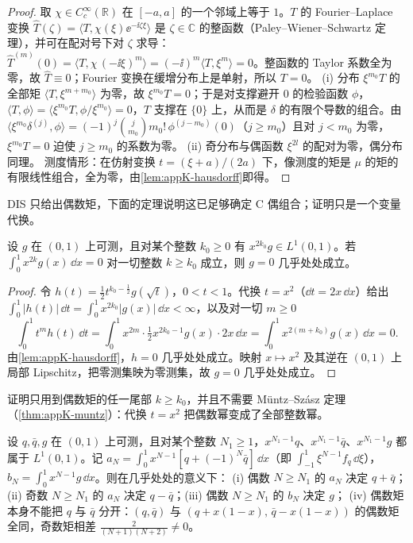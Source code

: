 \begin{proof}
取 $\chi\in C_c^\infty(\mathbb R)$ 在 $[-a,a]$ 的一个邻域上等于 $1$。$T$ 的 Fourier--Laplace 变换 $\hat T(\zeta)=\langle T,\chi(\xi)\ee^{-\ii\zeta\xi}\rangle$ 是 $\zeta\in\mathbb C$ 的整函数（Paley--Wiener--Schwartz 定理\cite[定理~7.3.1]{Hormander2003}），并可在配对号下对 $\zeta$ 求导：
$\hat T^{(m)}(0)=\langle T,\chi\,(-\ii\xi)^m\rangle=(-\ii)^m\langle T,\xi^m\rangle=0$。整函数的 Taylor 系数全为零，故 $\hat T\equiv0$；Fourier 变换在缓增分布上是单射\cite[第~7.1~节]{Hormander2003}，所以 $T=0$。
(i) 分布 $\xi^{m_0}T$ 的全部矩 $\langle T,\xi^{m+m_0}\rangle$ 为零，故 $\xi^{m_0}T=0$；于是对支撑避开 $0$ 的检验函数 $\phi$，$\langle T,\phi\rangle=\langle\xi^{m_0}T,\phi/\xi^{m_0}\rangle=0$，$T$ 支撑在 $\{0\}$ 上，从而是 $\delta$ 的有限个导数的组合\cite[定理~2.3.4]{Hormander2003}。由 $\langle\xi^{m_0}\delta^{(j)},\phi\rangle=(-1)^j\binom{j}{m_0}m_0!\,\phi^{(j-m_0)}(0)$（$j\ge m_0$）且对 $j<m_0$ 为零，$\xi^{m_0}T=0$ 迫使 $j\ge m_0$ 的系数为零。
(ii) 奇分布与偶函数 $\xi^{2l}$ 的配对为零，偶分布同理。
测度情形：在仿射变换 $t=(\xi+a)/(2a)$ 下，像测度的矩是 $\mu$ 的矩的有限线性组合，全为零，由\cref{lem:appK-hausdorff}即得。
\end{proof}

DIS 只给出偶数矩，下面的定理说明这已足够确定 C 偶组合；证明只是一个变量代换。

\begin{theorem}[偶数矩决定函数]\label{thm:appK-even-moments}
设 $g$ 在 $(0,1)$ 上可测，且对某个整数 $k_0\ge0$ 有 $x^{2k_0}g\in L^1(0,1)$。若 $\int_0^1x^{2k}g(x)\,\dd x=0$ 对一切整数 $k\ge k_0$ 成立，则 $g=0$ 几乎处处成立。
\end{theorem}

\begin{proof}
令 $h(t)=\frac12t^{k_0-\frac12}g(\sqrt t)$，$0<t<1$。代换 $t=x^2$（$\dd t=2x\,\dd x$）给出 $\int_0^1|h(t)|\,\dd t=\int_0^1x^{2k_0}|g(x)|\,\dd x<\infty$，以及对一切 $m\ge0$
\[
\int_0^1t^mh(t)\,\dd t=\int_0^1x^{2m}\cdot\tfrac12x^{2k_0-1}g(x)\cdot2x\,\dd x=\int_0^1x^{2(m+k_0)}g(x)\,\dd x=0 .
\]
由\cref{lem:appK-hausdorff}，$h=0$ 几乎处处成立。映射 $x\mapsto x^2$ 及其逆在 $(0,1)$ 上局部 Lipschitz，把零测集映为零测集，故 $g=0$ 几乎处处成立。
\end{proof}

证明只用到偶数矩的任一尾部 $k\ge k_0$，并且不需要 Müntz--Szász 定理（\cref{thm:appK-muntz}）：代换 $t=x^2$ 把偶数幂变成了全部整数幂。

\begin{corollary}\label{cor:appK-pdf}
设 $q,\bar q,g$ 在 $(0,1)$ 上可测，且对某个整数 $N_1\ge1$，$x^{N_1-1}q$、$x^{N_1-1}\bar q$、$x^{N_1-1}g$ 都属于 $L^1(0,1)$。记 $a_N=\int_0^1x^{N-1}[q+(-1)^N\bar q]\,\dd x$（即 $\int_{-1}^1\xi^{N-1}f_q\,\dd\xi$），$b_N=\int_0^1x^{N-1}g\,\dd x$。则在几乎处处的意义下：
(i) 偶数 $N\ge N_1$ 的 $a_N$ 决定 $q+\bar q$；(ii) 奇数 $N\ge N_1$ 的 $a_N$ 决定 $q-\bar q$；(iii) 偶数 $N\ge N_1$ 的 $b_N$ 决定 $g$；
(iv) 偶数矩本身不能把 $q$ 与 $\bar q$ 分开：$(q,\bar q)$ 与 $(q+x(1-x),\,\bar q-x(1-x))$ 的偶数矩全同，奇数矩相差 $\frac{2}{(N+1)(N+2)}\ne0$。
\end{corollary}

